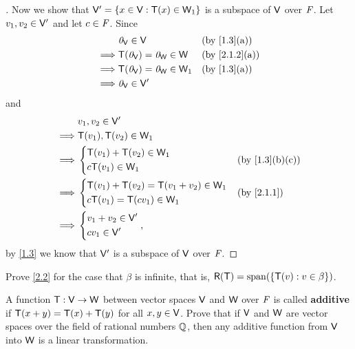 \begin{proof}[]
  Now we show that \(\mathsf{V}' = \left\lbrace x \in \mathsf{V} : \mathsf{T}(x) \in \mathsf{W}_1\right\rbrace\) is a subspace of \(\mathsf{V}\) over \(\mathit{F}\).
  Let \(v_1, v_2 \in \mathsf{V}'\) and let \(c \in \mathit{F}\).
  Since
  \begin{align*}
             & \zv_{\V} \in \V                  &  & \text{(by \cref{1.3}(a))}   \\
    \implies & \T(\zv_{\V}) = \zv_{\W} \in \W   &  & \text{(by \cref{2.1.2}(a))} \\
    \implies & \T(\zv_{\V}) = \zv_{\W} \in \W_1 &  & \text{(by \cref{1.3}(a))}   \\
    \implies & \zv_{\V} \in \V'
  \end{align*}
  and
  \begin{align*}
             & v_1, v_2 \in \V'                                              \\
    \implies & \T(v_1), \T(v_2) \in \W_1                                     \\
    \implies & \begin{dcases}
      \T(v_1) + \T(v_2) \in \W_1 \\
      c \T(v_1) \in \W_1
    \end{dcases}  &  & \text{(by \cref{1.3}(b)(c))} \\
    \implies & \begin{dcases}
      \T(v_1) + \T(v_2) = \T(v_1 + v_2) \in \W_1 \\
      c \T(v_1) = \T(c v_1) \in \W_1
    \end{dcases}  &  & \text{(by \cref{2.1.1})}     \\
    \implies & \begin{dcases}
      v_1 + v_2 \in \V' \\
      c v_1 \in \V'
    \end{dcases},
  \end{align*}
  by \cref{1.3} we know that \(\mathsf{V}'\) is a subspace of \(\mathsf{V}\) over \(\mathit{F}\).
\end{proof}

\begin{ex}\label{ex:2.1.33}
  Prove \cref{2.2} for the case that \(\beta\) is infinite, that is, \(\rg{\T} = \spn{\set{\T(v) : v \in \beta}}\).
\end{ex}

\begin{ex}\label{ex:2.1.37}
  A function \(\mathsf{T} : \mathsf{V} \to \mathsf{W}\) between vector spaces \(\mathsf{V}\) and \(\mathsf{W}\) over \(\mathit{F}\) is called \textbf{additive} if \(\mathsf{T}(x + y) = \mathsf{T}(x) + \mathsf{T}(y)\) for all \(x, y \in \mathsf{V}\).
  Prove that if \(\mathsf{V}\) and \(\mathsf{W}\) are vector spaces over the field of rational numbers \(\mathbb{Q}\), then any additive function from \(\mathsf{V}\) into \(\mathsf{W}\) is a linear transformation.
\end{ex}

